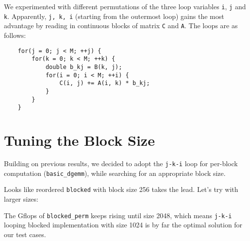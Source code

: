 \documentclass[11pt]{article}
\begin{document}
%


We experimented with different permutations of the three loop variables \texttt{i}, \texttt{j} and \texttt{k}. Apparently, \texttt{j, k, i} (starting from the outermost loop) gains the most advantage by reading in continuous blocks of matrix \texttt{C} and \texttt{A}. The loops are as follows:

\begin{lstlisting}
    for(j = 0; j < M; ++j) {
        for(k = 0; k < M; ++k) {
            double b_kj = B(k, j);
            for(i = 0; i < M; ++i) {
                C(i, j) += A(i, k) * b_kj;
            }
        }
    }
\end{lstlisting}

\section{Tuning the Block Size}

Building on previous results, we decided to adopt the \texttt{j-k-i} loop for per-block computation (\texttt{basic\_dgemm}), while searching for an appropriate block size. 


Looks like reordered \texttt{blocked} with block size 256 takes the lead. Let's try with larger sizes:


The Gflops of \texttt{blocked\_perm} keeps rising until size 2048, which means \texttt{j-k-i} looping blocked implementation with size 1024 is by far the optimal solution for our test cases.









\iffalse

\section{Conclusion}
``I always thought something was fundamentally wrong with the universe'' \citep{adams1995hitchhiker}




\fi
\end{document}

